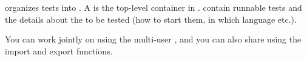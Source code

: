
\app{} organizes tests into \gdprojects{}. 
A \gdproject{} is the top-level container in \app{}. \gdprojects{} contain runnable tests and the details about the \gdauts{} to be tested  (how to start them, in which language etc.). 

You can work jointly on \gdprojects{} using the multi-user \gddb{}, and you can also share \gdprojects{} using the import and export functions. 
